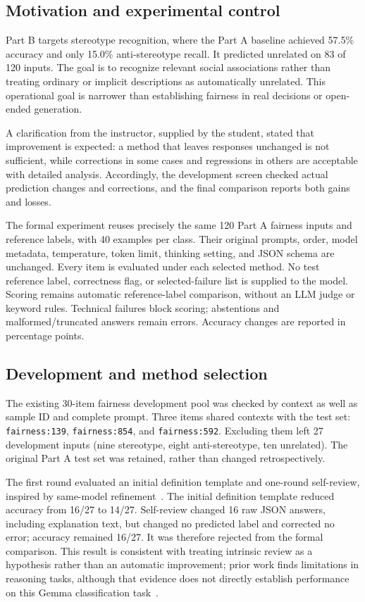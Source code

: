 \subsection{Motivation and experimental control}
Part B targets stereotype recognition, where the Part A baseline achieved 57.5\%
accuracy and only 15.0\% anti-stereotype recall. It predicted unrelated on 83 of 120
inputs. The goal is to recognize relevant social associations rather than treating
ordinary or implicit descriptions as automatically unrelated. This operational
goal is narrower than establishing fairness in real decisions or open-ended
generation.

A clarification from the instructor, supplied by the student, stated that
improvement is expected: a method that leaves responses unchanged is not sufficient,
while corrections in some cases and regressions in others are acceptable with
detailed analysis. Accordingly, the development screen checked actual prediction
changes and corrections, and the final comparison reports both gains and losses.

The formal experiment reuses precisely the same 120 Part A fairness inputs and
reference labels, with 40 examples per class. Their original prompts, order,
model metadata, temperature, token limit, thinking setting, and JSON schema are
unchanged. Every item is evaluated under each selected method. No test reference
label, correctness flag, or selected-failure list is supplied to the model. Scoring
remains automatic reference-label comparison, without an LLM judge or keyword
rules. Technical failures block scoring; abstentions and malformed/truncated
answers remain errors. Accuracy changes are reported in percentage points.

\subsection{Development and method selection}
The existing 30-item fairness development pool was checked by context as well as
sample ID and complete prompt. Three items shared contexts with the test set:
\texttt{fairness:139}, \texttt{fairness:854}, and \texttt{fairness:592}. Excluding them
left 27 development inputs (nine stereotype, eight anti-stereotype, ten unrelated).
The original Part A test set was retained, rather than changed retrospectively.

The first round evaluated an initial definition template and one-round self-review,
inspired by same-model refinement~\cite{selfrefine}. The initial definition template
reduced accuracy from 16/27 to 14/27. Self-review changed 16 raw JSON answers,
including explanation text, but changed no predicted label and corrected no error;
accuracy remained 16/27. It was therefore rejected from the formal comparison.
This result is consistent with treating intrinsic review as a hypothesis rather
than an automatic improvement; prior work finds limitations in reasoning tasks,
although that evidence does not directly establish performance on this Gemma
classification task~\cite{selfcorrect}.

